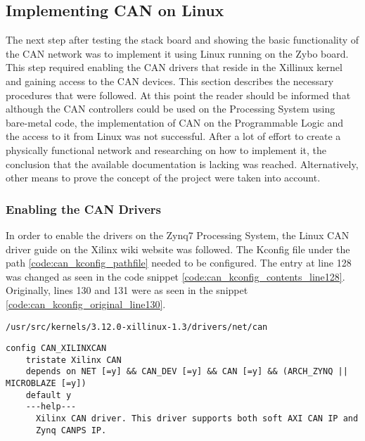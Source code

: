 \subsection{Implementing CAN on Linux}

The next step after testing the stack board and showing the basic functionality of the CAN network was to implement it using Linux running on the Zybo board.
This step required enabling the CAN drivers that reside in the Xillinux kernel and gaining access to the CAN devices.
This section describes the necessary procedures that were followed.
At this point the reader should be informed that although the CAN controllers could be used on the Processing System using bare-metal code, the implementation of CAN on the Programmable Logic and the access to it from Linux was not successful.
After a lot of effort to create a physically functional network and researching on how to implement it, the conclusion that the available documentation is lacking was reached. 
Alternatively, other means to prove the concept of the project were taken into account.

\subsubsection{Enabling the CAN Drivers}

In order to enable the drivers on the Zynq7 Processing System, the Linux CAN driver guide \cite{Xilinx_wiki_Linux_CAN_driver} on the Xilinx wiki website \cite{Xilinx_wiki} was followed.
The Kconfig file under the path \ref{code:can_kconfig_pathfile} needed to be configured.
The entry at line 128 was changed as seen in the code snippet \ref{code:can_kconfig_contents_line128}.
Originally, lines 130 and 131 were as seen in the snippet \ref{code:can_kconfig_original_line130}.

\begin{lstlisting}[caption={CAN Kconfig pathfile.},numbers=none,label=code:can_kconfig_pathfile]
/usr/src/kernels/3.12.0-xillinux-1.3/drivers/net/can
\end{lstlisting}


\begin{lstlisting}[firstnumber=128,caption={Kconfig file contents from line 128.},label=code:can_kconfig_contents128]
config CAN_XILINXCAN
	tristate Xilinx CAN
	depends on NET [=y] && CAN_DEV [=y] && CAN [=y] && (ARCH_ZYNQ || MICROBLAZE [=y])
	default y
	---help---
	  Xilinx CAN driver. This driver supports both soft AXI CAN IP and
	  Zynq CANPS IP.
\end{lstlisting}

